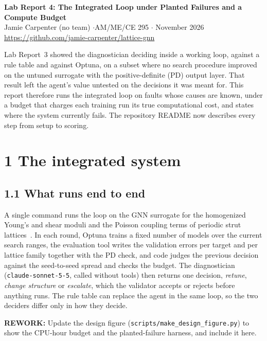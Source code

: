 \documentclass[11pt]{article}
\newcommand{\rework}[1]{\noindent\colorbox{yellow!40}{\parbox{\dimexpr\linewidth-2\fboxsep}{%
  \small\textbf{REWORK:} #1}}\par}
\begin{document}
\begin{center}
  {\Large\bfseries Lab Report 4: The Integrated Loop under Planted Failures and a Compute Budget}\\[0.5ex]
  Jamie Carpenter (no team) \quad$\cdot$\quad AM/ME/CE 295 \quad$\cdot$ November 2026\\
  \url{https://github.com/jamie-carpenter/lattice-gnn}
\end{center}

\noindent Lab Report~3 showed the diagnostician deciding inside a working loop, against a rule
table and against Optuna, on a subset where no search procedure improved on the untuned surrogate
with the positive-definite (PD) output layer. That result left the agent's value untested on the
decisions it was meant for. This report therefore runs the integrated loop on faults whose causes
are known, under a budget that charges each training run its true computational cost, and states
where the system currently fails. The repository README now describes every step from setup to
scoring.

\section*{1 \quad The integrated system}

\subsection*{1.1 \quad What runs end to end}
A single command runs the loop on the GNN surrogate for the homogenized Young's and shear moduli
and the Poisson coupling terms of periodic strut lattices~\cite{lumpe}. In each round, Optuna
trains a fixed number of models over the current search ranges, the evaluation tool writes the
validation errors per target and per lattice family together with the PD check, and code judges
the previous decision against the seed-to-seed spread and checks the budget. The diagnostician
(\texttt{claude-sonnet-5-5}, called without tools) then returns one decision, \emph{retune},
\emph{change structure} or \emph{escalate}, which the validator accepts or rejects before anything
runs. The rule table can replace the agent in the same loop, so the two deciders differ only in
how they decide.

\rework{Update the design figure (\texttt{scripts/make\_design\_figure.py}) to show the
CPU-hour budget and the planted-failure harness, and include it here.}
\end{document}

